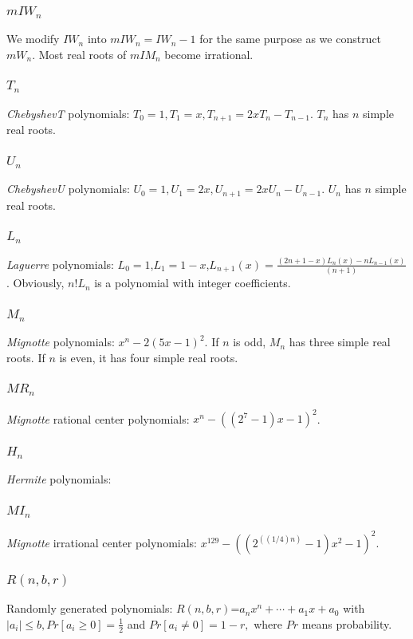  \subsubsection{$ mIW_n$ }
 We modify $IW_n$  into $mIW_n=IW_n-1$ for the same purpose  as we construct $mW_n$. Most real roots of $mIM_n$  become irrational.
 \subsubsection{$T_n$} {\it ChebyshevT} polynomials: $T_0=1,T_1=x,T_{n+1}=2xT_n-T_{n-1}$. $T_n$ has $n$ simple real roots.
 \subsubsection{$U_n$} {\it ChebyshevU} polynomials: $U_0=1,U_1=2x,U_{n+1}=2xU_n-U_{n-1}$. $U_n$ has $n$ simple real roots.
 \subsubsection{$L_n$}
 {\it Laguerre}  polynomials: $L_0=1$,$L_1=1-x$,$L_{n+1}(x)=\frac{  (2n+1-x )L_n(x)-  nL_{n-1 }(x)}{(n+1) }$. %
Obviously, $n!L_n$ is a polynomial with integer coefficients.
 \subsubsection{$M_n$} {\it Mignotte} polynomials: $x^n-2(5x-1)^2$. If $n$ is odd, $M_n$ has three simple real roots. If $n$ is even, it has four simple real roots.

\subsubsection{$MR_n$}{\it Mignotte} rational center polynomials: $ x^n-((2^7-1)x-1)^2$.
	 
 \subsubsection{$H_n$}{\it Hermite } polynomials:
 
 \subsubsection{$MI_n$} {\it Mignotte} irrational center polynomials: $x^{129}-((2^((1/4)n)-1)x^2-1)^2$.
 
 
 \subsubsection{$R(n,b,r) $} Randomly generated polynomials: $R(n,b,r)$=$a_nx^n+\cdots+a_1x+a_0$ with $|a_i|\le b, Pr[a_i\ge 0]=\frac{1}{2}$ and  $Pr[a_i\neq 0] =1-r,$ where $Pr$ means probability.
